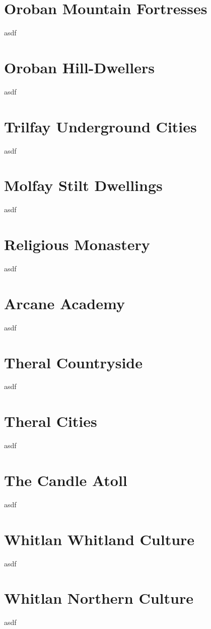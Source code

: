 \section{Oroban Mountain Fortresses}
asdf

\section{Oroban Hill-Dwellers}
asdf

\section{Trilfay Underground Cities}
asdf

\section{Molfay Stilt Dwellings}
asdf

\section{Religious Monastery}
asdf

\section{Arcane Academy}
asdf

\section{Theral Countryside}
asdf

\section{Theral Cities}
asdf

\section{The Candle Atoll}
asdf

\section{Whitlan Whitland Culture}
asdf

\section{Whitlan Northern Culture}
asdf


